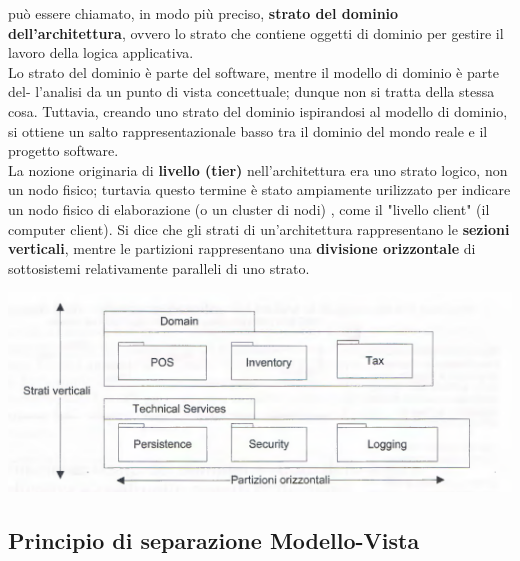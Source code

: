 \documentclass[a4paper,12pt, oneside]{book}
\begin{document}
può essere chiamato, in modo più preciso, \textbf{strato del dominio dell'architettura}, ovvero
lo strato che contiene oggetti di dominio per gestire il lavoro della logica applicativa.\\
Lo strato del dominio è parte del software, mentre il modello di dominio è parte del-
l'analisi da un punto di vista concettuale; dunque non si tratta della stessa cosa. Tuttavia,
creando uno strato del dominio ispirandosi al modello di dominio, si ottiene un salto
rappresentazionale basso tra il dominio del mondo reale e il progetto software.\\
La nozione originaria di \textbf{livello (tier)} nell'architettura era uno strato logico, non un
nodo fisico; turtavia questo termine è stato ampiamente urilizzato per indicare un nodo
fisico di elaborazione (o un cluster di nodi) , come il "livello client" (il computer client). Si dice che gli strati di un'architettura rappresentano le \textbf{sezioni verticali},
mentre le partizioni rappresentano una \textbf{divisione orizzontale} di sottosistemi relativamente paralleli di
uno strato.
\begin{center}
\includegraphics[scale =0.7]{img/log5.png}
\end{center}
\subsection{Principio di separazione Modello-Vista}
\end{document}

